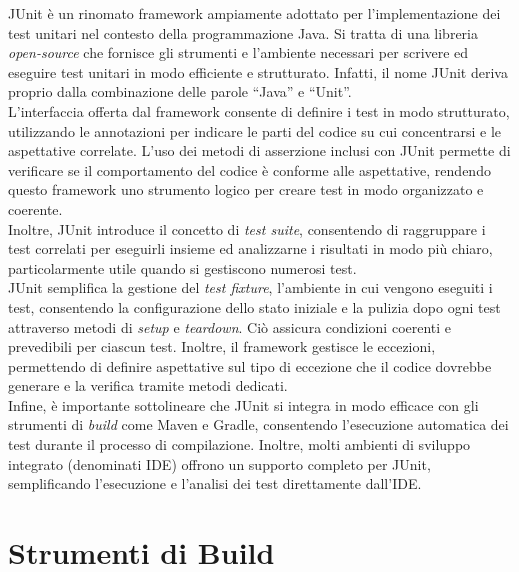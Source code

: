 JUnit è un rinomato framework ampiamente adottato per l’implementazione dei test unitari nel contesto della programmazione Java. Si tratta di una libreria \textit{open-source} che fornisce gli strumenti e l’ambiente necessari per scrivere ed eseguire test unitari in modo efficiente e strutturato.\cite{UNITTEST_geekandjob} Infatti, il nome JUnit deriva proprio dalla combinazione delle parole “Java” e “Unit”.\cite{UNITTEST_browserstack}\\
L’interfaccia offerta dal framework consente di definire i test in modo strutturato, utilizzando le annotazioni per indicare le parti del codice su cui concentrarsi e le aspettative correlate. L’uso dei metodi di asserzione inclusi con JUnit permette di verificare se il comportamento del codice è conforme alle aspettative, rendendo questo framework uno strumento logico per creare test in modo organizzato e coerente.\\
Inoltre, JUnit introduce il concetto di \textit{test suite}, consentendo di raggruppare i test correlati per eseguirli insieme ed analizzarne i risultati in modo più chiaro, particolarmente utile quando si gestiscono numerosi test.\\
JUnit semplifica la gestione del \textit{test fixture}, l’ambiente in cui vengono eseguiti i test, consentendo la configurazione dello stato iniziale e la pulizia dopo ogni test attraverso metodi di \textit{setup} e \textit{teardown}. Ciò assicura condizioni coerenti e prevedibili per ciascun test. Inoltre, il framework gestisce le eccezioni, permettendo di definire aspettative sul tipo di eccezione che il codice dovrebbe generare e la verifica tramite metodi dedicati.\\
Infine, è importante sottolineare che JUnit si integra in modo efficace con gli strumenti di \textit{build} come Maven e Gradle, consentendo l’esecuzione automatica dei test durante il processo di compilazione. Inoltre, molti ambienti di sviluppo integrato (denominati IDE) offrono un supporto completo per JUnit, semplificando l’esecuzione e l’analisi dei test direttamente dall’IDE.\cite{UNITTEST_junit}

\section{Strumenti di Build}

